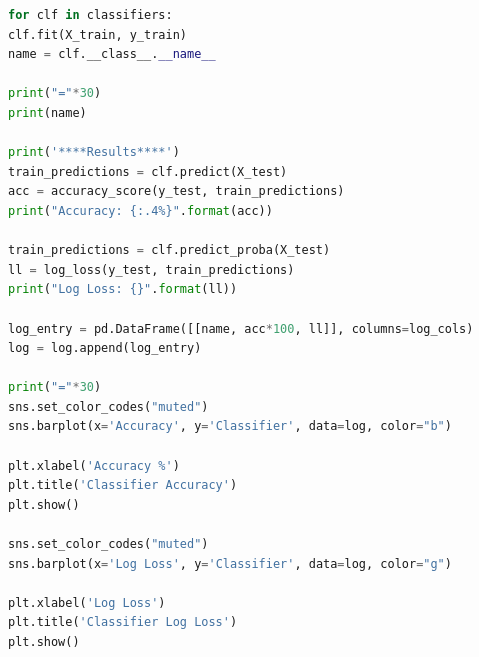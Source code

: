 \documentclass{whutmod}
\begin{document}
\begin{lstlisting}[language=python]
for clf in classifiers:
clf.fit(X_train, y_train)
name = clf.__class__.__name__

print("="*30)
print(name)

print('****Results****')
train_predictions = clf.predict(X_test)
acc = accuracy_score(y_test, train_predictions)
print("Accuracy: {:.4%}".format(acc))

train_predictions = clf.predict_proba(X_test)
ll = log_loss(y_test, train_predictions)
print("Log Loss: {}".format(ll))

log_entry = pd.DataFrame([[name, acc*100, ll]], columns=log_cols)
log = log.append(log_entry)

print("="*30)
sns.set_color_codes("muted")
sns.barplot(x='Accuracy', y='Classifier', data=log, color="b")

plt.xlabel('Accuracy %')
plt.title('Classifier Accuracy')
plt.show()

sns.set_color_codes("muted")
sns.barplot(x='Log Loss', y='Classifier', data=log, color="g")

plt.xlabel('Log Loss')
plt.title('Classifier Log Loss')
plt.show()
\end{lstlisting}
\end{document}
